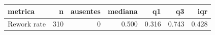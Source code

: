 \begin{tabular}{lrrrrrr}
\toprule
metrica & n & ausentes & mediana & q1 & q3 & iqr \\
\midrule
Rework rate & 310 & 0 & 0.500 & 0.316 & 0.743 & 0.428 \\
\bottomrule
\end{tabular}

